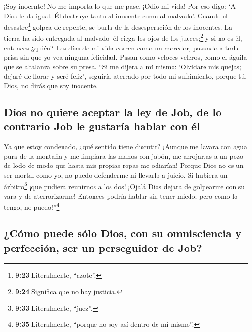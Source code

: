  ¡Soy inocente! No me importa lo que me pase. ¡Odio mi
vida!  Por eso digo: `A Dios le da igual. Él destruye
tanto al inocente como al malvado'.  Cuando el
desastre\footnote{\textbf{9:23} Literalmente, ``azote''.} golpea de
repente, se burla de la desesperación de los inocentes. 
La tierra ha sido entregada al malvado; él ciega los ojos de los
jueces;\footnote{\textbf{9:24} Significa que no hay justicia.} y si no
es él, entonces ¿quién?  Los días de mi vida corren como
un corredor, pasando a toda prisa sin que yo vea ninguna felicidad.
 Pasan como veloces veleros, como el águila que se
abalanza sobre su presa.  ``Si me dijera a mí mismo:
`Olvidaré mis quejas; dejaré de llorar y seré feliz', 
seguiría aterrado por todo mi sufrimiento, porque tú, Dios, no dirás que
soy inocente.

\hypertarget{dios-no-quiere-aceptar-la-ley-de-job-de-lo-contrario-job-le-gustaruxeda-hablar-con-uxe9l}{%
\subsection{Dios no quiere aceptar la ley de Job, de lo contrario Job le
gustaría hablar con
él}\label{dios-no-quiere-aceptar-la-ley-de-job-de-lo-contrario-job-le-gustaruxeda-hablar-con-uxe9l}}

 Ya que estoy condenado, ¿qué sentido tiene discutir?
 ¡Aunque me lavara con agua pura de la montaña y me
limpiara las manos con jabón,  me arrojarías a un pozo de
lodo de modo que hasta mis propias ropas me odiarían! 
Porque Dios no es un ser mortal como yo, no puedo defenderme ni llevarlo
a juicio.  Si hubiera un árbitro\footnote{\textbf{9:33}
  Literalmente, ``juez''.} ¡que pudiera reunirnos a los dos!
 ¡Ojalá Dios dejara de golpearme con su vara y de
aterrorizarme!  Entonces podría hablar sin tener miedo;
pero como lo tengo, no puedo!''\footnote{\textbf{9:35} Literalmente,
  ``porque no soy así dentro de mí mismo''.}

\hypertarget{cuxf3mo-puede-suxf3lo-dios-con-su-omnisciencia-y-perfecciuxf3n-ser-un-perseguidor-de-job}{%
\subsection{¿Cómo puede sólo Dios, con su omnisciencia y perfección, ser
un perseguidor de
Job?}\label{cuxf3mo-puede-suxf3lo-dios-con-su-omnisciencia-y-perfecciuxf3n-ser-un-perseguidor-de-job}}

